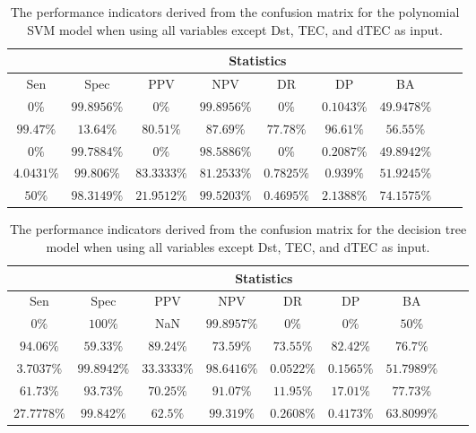 \begin{table}[!ht]
	\centering
	\begin{tabular}{|c|c|c|c|c|c|c|c|c|}
		\hline
		 & \multicolumn{7}{c|}{Statistics} \\ \hline
		Sen & Spec & PPV & NPV & DR & DP & BA \\ \hline
		$0\%$ & $99.8956\%$ & $0\%$ & $99.8956\%$ & $0\%$ & $0.1043\%$ & $49.9478\%$ \\ \hline
		$99.47\%$ & $13.64\%$ & $80.51\%$ & $87.69\%$ & $77.78\%$ & $96.61\%$ & $56.55\%$ \\ \hline
		$0\%$ & $99.7884\%$ & $0\%$ & $98.5886\%$ & $0\%$ & $0.2087\%$ & $49.8942\%$ \\ \hline
		$4.0431\%$ & $99.806\%$ & $83.3333\%$ & $81.2533\%$ & $0.7825\%$ & $0.939\%$ & $51.9245\%$ \\ \hline
		$50\%$ & $98.3149\%$ & $21.9512\%$ & $99.5203\%$ & $0.4695\%$ & $2.1388\%$ & $74.1575\%$ \\ \hline
	\end{tabular}
	\caption{The performance indicators derived from the confusion matrix for the polynomial SVM model when using all variables except Dst, TEC, and dTEC as input.}
	\label{tab:cs:noTEC:svmPoly}
\end{table}

\begin{table}[!ht]
	\centering
	\begin{tabular}{|c|c|c|c|c|c|c|c|c|}
		\hline
		 & \multicolumn{7}{c|}{Statistics} \\ \hline
		Sen & Spec & PPV & NPV & DR & DP & BA \\ \hline
		$0\%$ & $100\%$ & NaN & $99.8957\%$ & $0\%$ & $0\%$ & $50\%$ \\ \hline
		$94.06\%$ & $59.33\%$ & $89.24\%$ & $73.59\%$ & $73.55\%$ & $82.42\%$ & $76.7\%$ \\ \hline
		$3.7037\%$ & $99.8942\%$ & $33.3333\%$ & $98.6416\%$ & $0.0522\%$ & $0.1565\%$ & $51.7989\%$ \\ \hline
		$61.73\%$ & $93.73\%$ & $70.25\%$ & $91.07\%$ & $11.95\%$ & $17.01\%$ & $77.73\%$ \\ \hline
		$27.7778\%$ & $99.842\%$ & $62.5\%$ & $99.319\%$ & $0.2608\%$ & $0.4173\%$ & $63.8099\%$ \\ \hline
	\end{tabular}
	\caption{The performance indicators derived from the confusion matrix for the decision tree model when using all variables except Dst, TEC, and dTEC as input.}
	\label{tab:cs:noTEC:C5.0}
\end{table}


